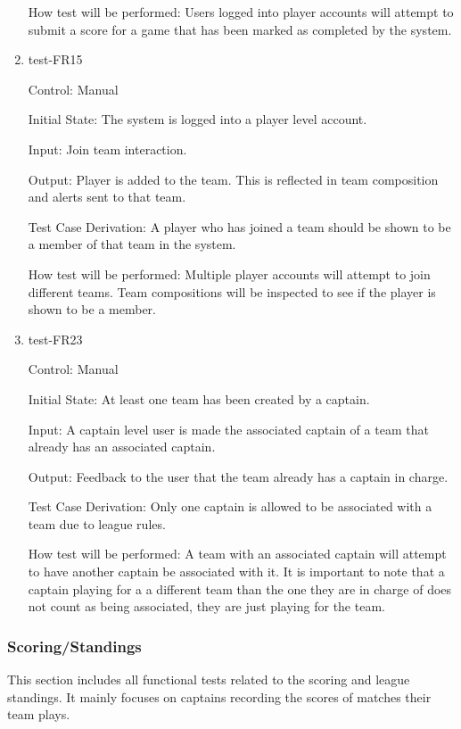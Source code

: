 \documentclass[12pt, titlepage]{article}
\begin{document}
\begin{enumerate}
  How test will be performed: Users logged into player accounts will 
  attempt to submit a score for a game that has been marked as completed 
  by the system.

  \item{test-FR15\\}

  Control: Manual

  Initial State: The system is logged into a player level account.

  Input: Join team interaction.

  Output: Player is added to the team. This is reflected in team composition
  and alerts sent to that team.

  Test Case Derivation: A player who has joined a team should be shown to be a
  member of that team in the system.

  How test will be performed: Multiple player accounts will attempt to join 
  different teams. Team compositions will be inspected to see if the player
  is shown to be a member. 

  \item{test-FR23\\}

  Control: Manual

  Initial State: At least one team has been created by a captain.

  Input: A captain level user is made the associated captain of a team that
  already has an associated captain.

  Output: Feedback to the user that the team already has a captain in charge.

  Test Case Derivation: Only one captain is allowed to be associated with a
  team due to league rules.

  How test will be performed: A team with an associated captain will attempt
  to have another captain be associated with it. It is important to note that
  a captain playing for a a different team than the one they are in charge of
  does not count as being associated, they are just playing for the team.

\end{enumerate}

\subsubsection{Scoring/Standings}

This section includes all functional tests related to the scoring and
league standings. It mainly focuses on captains recording the scores of
matches their team plays.
\end{document}
